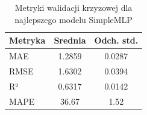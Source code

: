 \begin{table}[h]
\centering
\caption{Metryki walidacji krzyzowej dla najlepszego modelu SimpleMLP}
\label{tab:cv_metrics_mlp}
\begin{tabular}{lcc}
\toprule
Metryka & Srednia & Odch. std. \\
\midrule
MAE & 1.2859 & 0.0287 \\
RMSE & 1.6302 & 0.0394 \\
R² & 0.6317 & 0.0142 \\
MAPE & 36.67 & 1.52 \\
\bottomrule
\end{tabular}
\end{table}
